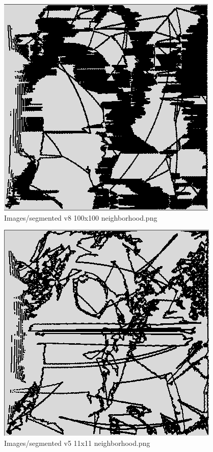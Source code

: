 \begin{figure}[H]
\includegraphics[width=\textwidth]{Images/segmented_v8_100x100_neighborhood.png}
\caption{Images/segmented v8 100x100 neighborhood.png}
\label{fig:Images/segmented v8 100x100 neighborhood.png}
\end{figure}
\begin{figure}[H]
\includegraphics[width=\textwidth]{Images/segmented_v5_11x11_neighborhood.png}
\caption{Images/segmented v5 11x11 neighborhood.png}
\label{fig:Images/segmented v5 11x11 neighborhood.png}
\end{figure}
